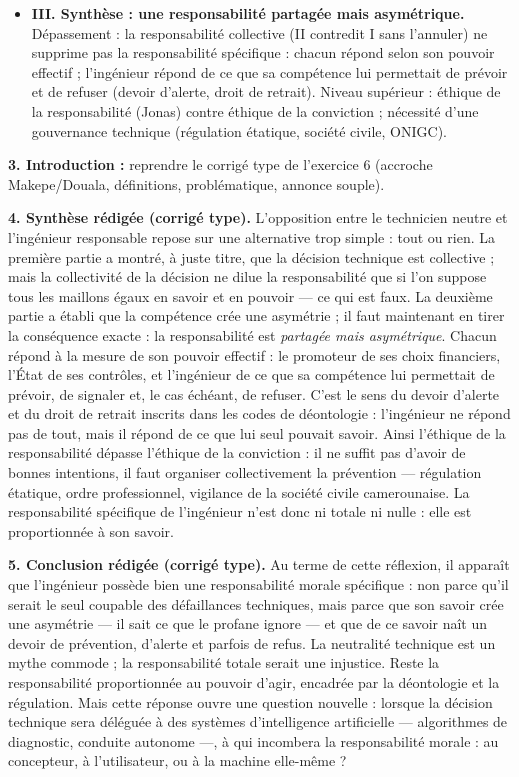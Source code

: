 \documentclass[11pt]{article}
\begin{document}
\begin{corrige}
\begin{itemize}
    \item \textbf{III. Synthèse : une responsabilité partagée mais asymétrique.} Dépassement : la responsabilité collective (II contredit I sans l'annuler) ne supprime pas la responsabilité spécifique : chacun répond selon son pouvoir effectif ; l'ingénieur répond de ce que sa compétence lui permettait de prévoir et de refuser (devoir d'alerte, droit de retrait). Niveau supérieur : éthique de la responsabilité (Jonas) contre éthique de la conviction ; nécessité d'une gouvernance technique (régulation étatique, société civile, ONIGC).
\end{itemize}
\textbf{3. Introduction :} reprendre le corrigé type de l'exercice 6 (accroche Makepe/Douala, définitions, problématique, annonce souple).\par
\textbf{4. Synthèse rédigée (corrigé type).} L'opposition entre le technicien neutre et l'ingénieur responsable repose sur une alternative trop simple : tout ou rien. La première partie a montré, à juste titre, que la décision technique est collective ; mais la collectivité de la décision ne dilue la responsabilité que si l'on suppose tous les maillons égaux en savoir et en pouvoir — ce qui est faux. La deuxième partie a établi que la compétence crée une asymétrie ; il faut maintenant en tirer la conséquence exacte : la responsabilité est \emph{partagée mais asymétrique}. Chacun répond à la mesure de son pouvoir effectif : le promoteur de ses choix financiers, l'État de ses contrôles, et l'ingénieur de ce que sa compétence lui permettait de prévoir, de signaler et, le cas échéant, de refuser. C'est le sens du devoir d'alerte et du droit de retrait inscrits dans les codes de déontologie : l'ingénieur ne répond pas de tout, mais il répond de ce que lui seul pouvait savoir. Ainsi l'éthique de la responsabilité dépasse l'éthique de la conviction : il ne suffit pas d'avoir de bonnes intentions, il faut organiser collectivement la prévention — régulation étatique, ordre professionnel, vigilance de la société civile camerounaise. La responsabilité spécifique de l'ingénieur n'est donc ni totale ni nulle : elle est proportionnée à son savoir.\par
\textbf{5. Conclusion rédigée (corrigé type).} Au terme de cette réflexion, il apparaît que l'ingénieur possède bien une responsabilité morale spécifique : non parce qu'il serait le seul coupable des défaillances techniques, mais parce que son savoir crée une asymétrie — il sait ce que le profane ignore — et que de ce savoir naît un devoir de prévention, d'alerte et parfois de refus. La neutralité technique est un mythe commode ; la responsabilité totale serait une injustice. Reste la responsabilité proportionnée au pouvoir d'agir, encadrée par la déontologie et la régulation. Mais cette réponse ouvre une question nouvelle : lorsque la décision technique sera déléguée à des systèmes d'intelligence artificielle — algorithmes de diagnostic, conduite autonome —, à qui incombera la responsabilité morale : au concepteur, à l'utilisateur, ou à la machine elle-même ?\par

\end{corrige}
\end{document}
